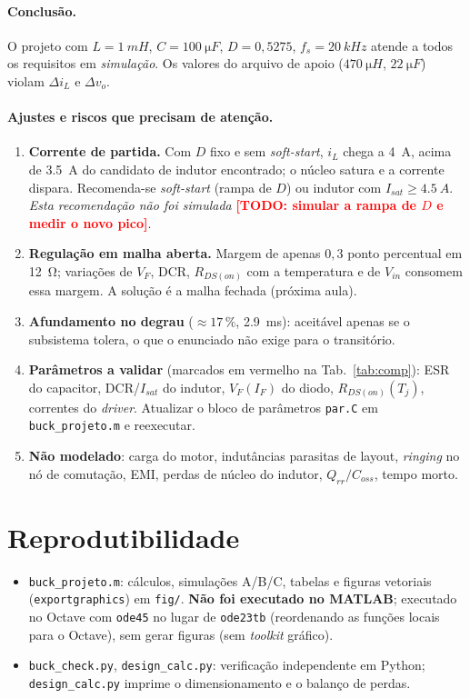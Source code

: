 \documentclass[11pt,a4paper]{article}
\newcommand{\TODO}[1]{\textcolor{red}{\textbf{[TODO: #1]}}}
\newcommand{\fs}{f_s}
\newcommand{\Vin}{V_{in}}
\newcommand{\dIL}{\Delta i_L}
\newcommand{\dvo}{\Delta v_o}
\begin{document}
\paragraph{Conclus\~ao.} O projeto com $L=\SI{1}{mH}$, $C=\SI{100}{\micro F}$, $D=0{,}5275$, $\fs=\SI{20}{kHz}$ atende a todos os requisitos em \emph{simula\c{c}\~ao}. Os valores do arquivo de apoio ($\SI{470}{\micro H}$, $\SI{22}{\micro F}$) violam $\dIL$ e $\dvo$.

\paragraph{Ajustes e riscos que precisam de aten\c{c}\~ao.}
\begin{enumerate}
 \item \textbf{Corrente de partida.} Com $D$ fixo e sem \emph{soft-start}, $i_L$ chega a \SI{4}{A}, acima de \SI{3,5}{A} do candidato de indutor encontrado; o n\'ucleo satura e a corrente dispara. Recomenda-se \emph{soft-start} (rampa de $D$) ou indutor com $I_{sat}\ge\SI{4,5}{A}$. \emph{Esta recomenda\c{c}\~ao n\~ao foi simulada} \TODO{simular a rampa de $D$ e medir o novo pico}.
 \item \textbf{Regula\c{c}\~ao em malha aberta.} Margem de apenas $0{,}3$ ponto percentual em \SI{12}{\ohm}; varia\c{c}\~oes de $V_F$, DCR, $R_{DS(on)}$ com a temperatura e de $\Vin$ consomem essa margem. A solu\c{c}\~ao \'e a malha fechada (pr\'oxima aula).
 \item \textbf{Afundamento no degrau} ($\approx17\,\%$, \SI{2,9}{ms}): aceit\'avel apenas se o subsistema tolera, o que o enunciado n\~ao exige para o transit\'orio.
 \item \textbf{Par\^ametros a validar} (marcados em vermelho na Tab.~\ref{tab:comp}): ESR do capacitor, DCR/$I_{sat}$ do indutor, $V_F(I_F)$ do diodo, $R_{DS(on)}(T_j)$, correntes do \emph{driver}. Atualizar o bloco de par\^ametros \texttt{par.C} em \texttt{buck\_projeto.m} e reexecutar.
 \item \textbf{N\~ao modelado}: carga do motor, indut\^ancias parasitas de layout, \emph{ringing} no n\'o de comuta\c{c}\~ao, EMI, perdas de n\'ucleo do indutor, $Q_{rr}/C_{oss}$, tempo morto.
\end{enumerate}

\section{Reprodutibilidade}
\begin{itemize}
 \item \texttt{buck\_projeto.m}: c\'alculos, simula\c{c}\~oes A/B/C, tabelas e figuras vetoriais (\texttt{exportgraphics}) em \texttt{fig/}. \textbf{N\~ao foi executado no MATLAB}; executado no Octave com \texttt{ode45} no lugar de \texttt{ode23tb} (reordenando as fun\c{c}\~oes locais para o Octave), sem gerar figuras (sem \emph{toolkit} gr\'afico).
 \item \texttt{buck\_check.py}, \texttt{design\_calc.py}: verifica\c{c}\~ao independente em Python; \texttt{design\_calc.py} imprime o dimensionamento e o balan\c{c}o de perdas.
\end{itemize}

\nocite{lyshevski2017,boylestad2012,slva477,slua618}


\end{document}
